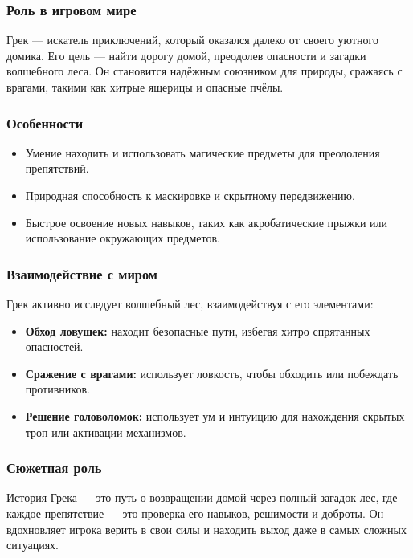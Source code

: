 \documentclass{article}
\begin{document}
\subsubsection{Роль в игровом мире} 
Грек — искатель приключений, который оказался далеко от своего уютного домика. Его цель — найти дорогу домой, преодолев опасности и загадки волшебного леса. Он становится надёжным союзником для природы, сражаясь с врагами, такими как хитрые ящерицы и опасные пчёлы.

\subsubsection{Особенности} 
\begin{itemize}
    \item Умение находить и использовать магические предметы для преодоления препятствий.
    \item Природная способность к маскировке и скрытному передвижению.
    \item Быстрое освоение новых навыков, таких как акробатические прыжки или использование окружающих предметов.
\end{itemize}

\subsubsection{Взаимодействие с миром} 
Грек активно исследует волшебный лес, взаимодействуя с его элементами:
\begin{itemize}
    \item \textbf{Обход ловушек:} находит безопасные пути, избегая хитро спрятанных опасностей.
    \item \textbf{Сражение с врагами:} использует ловкость, чтобы обходить или побеждать противников.
    \item \textbf{Решение головоломок:} использует ум и интуицию для нахождения скрытых троп или активации механизмов.
\end{itemize}

\subsubsection{Сюжетная роль} 
История Грека — это путь о возвращении домой через полный загадок лес, где каждое препятствие — это проверка его навыков, решимости и доброты. Он вдохновляет игрока верить в свои силы и находить выход даже в самых сложных ситуациях.
\end{document}
